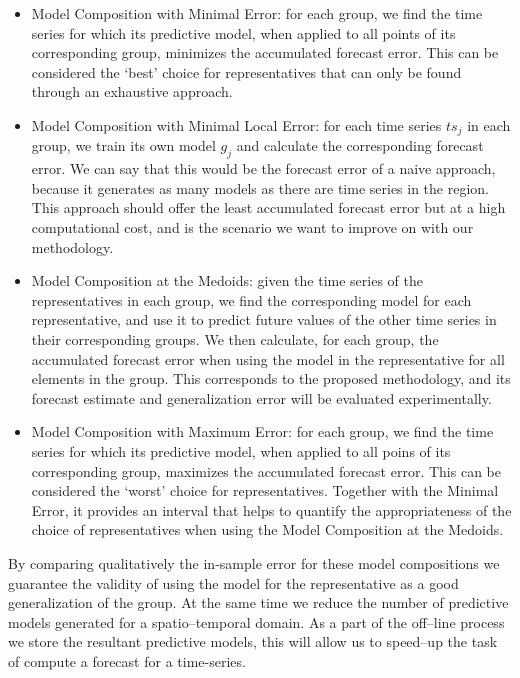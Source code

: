 \begin{itemize}%
	\item Model Composition with Minimal Error: for each group, we find the time series for which its predictive model, when applied to all points of its corresponding group, minimizes the accumulated forecast error. This can be considered the `best' choice for representatives that can only be found through an exhaustive approach.
	\item Model Composition with Minimal Local Error: for each time series $ts_j$ in each group, we train its own model $g_j$ and calculate the corresponding forecast error. We can say that this would be the forecast error of a naive approach, because it generates as many models as there are time series in the region. This approach should offer the least accumulated forecast error but at a high computational cost, and is the scenario we want to improve on with our methodology.
	\item Model Composition at the Medoids: given the time series of the representatives in each group, we find the corresponding model for each representative, and use it to predict future values of the other time series in their corresponding groups. We then calculate, for each group, the accumulated forecast error when using the model in the representative for all elements in the group. This corresponds to the proposed methodology, and its forecast estimate and generalization error will be evaluated experimentally.
	\item Model Composition with Maximum Error: for each group, we find the time series for which its predictive model, when applied to all poins of its corresponding group, maximizes the accumulated forecast error. This can be considered the `worst' choice for representatives. Together with the Minimal Error, it provides an interval that helps to quantify the appropriateness of the choice of representatives when using the Model Composition at the Medoids.
\end{itemize}

By comparing qualitatively the in-sample error for these model compositions we guarantee the validity of using the model for the representative as a good generalization of the group. At the same time we reduce the number of predictive models generated for a spatio--temporal domain. As a part of the off--line process we store the resultant predictive models, this will allow us to speed--up the task of compute a forecast for a time-series.

